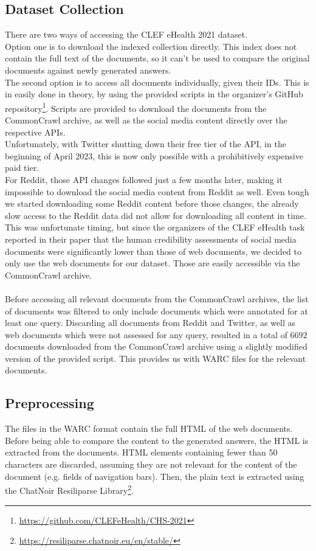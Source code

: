 \subsection{Dataset Collection}
There are two ways of accessing the CLEF eHealth 2021 dataset.
\\
Option one is to download the indexed collection directly.
This index does not contain the full text of the documents, so it can't be used to compare the original documents against newly generated answers.
\\
The second option is to access all documents individually, given their IDs.
This is in easily done in theory, by using the provided scripts in the organizer's GitHub repository\footnote{\url{https://github.com/CLEFeHealth/CHS-2021}}.
Scripts are provided to download the documents from the CommonCrawl archive, as well as the social media content directly over the respective APIs.
\\
Unfortunately, with Twitter shutting down their free tier of the API, in the beginning of April 2023, this is now only possible with a prohibitively expensive paid tier.
\\
For Reddit, those API changes followed just a few months later, making it impossible to download the social media content from Reddit as well.
Even tough we started downloading some Reddit content before those changes, the already slow access to the Reddit data did not allow for downloading all content in time.
\\
This was unfortunate timing, but since the organizers of the CLEF eHealth task reported in their paper that the human credibility assessments of social media documents were significantly lower than those of web documents, we decided to only use the web documents for our dataset.
Those are easily accessible via the CommonCrawl archive.
\\
\\
Before accessing all relevant documents from the CommonCrawl archives, the list of documents was filtered to only include documents which were annotated for at least one query.
Discarding all documents from Reddit and Twitter, as well as web documents which were not assessed for any query, resulted in a total of $6692$ documents downloaded from the CommonCrawl archive using a slightly modified version of the provided script.
This provides us with WARC files for the relevant documents.

\subsection{Preprocessing}
The files in the WARC format contain the full HTML of the web documents.
Before being able to compare the content to the generated answers, the HTML is extracted from the documents.
HTML elements containing fewer than 50 characters are discarded, assuming they are not relevant for the content of the document (e.g. fields of navigation bars).
Then, the plain text is extracted using the ChatNoir Resiliparse Library\footnote{\url{https://resiliparse.chatnoir.eu/en/stable/}}.


